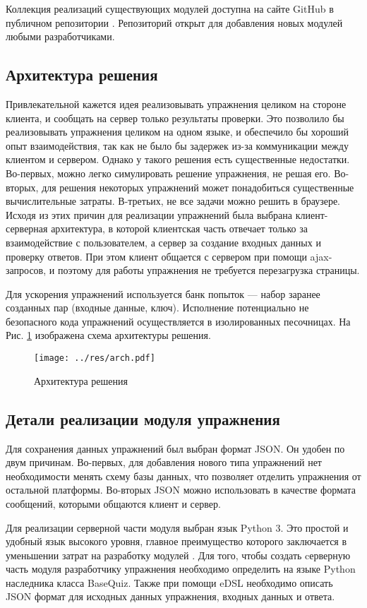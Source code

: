 \documentclass{matmex-diploma-custom}
\begin{document}
Коллекция реализаций существующих модулей доступна на сайте GitHub в
публичном репозитории \cite{plugins:repo}. Репозиторий открыт для
добавления новых модулей любыми разработчиками.

\subsection{Архитектура решения}
Привлекательной кажется идея реализовывать упражнения целиком на
стороне клиента, и сообщать на сервер только результаты проверки. Это
позволило бы реализовывать упражнения целиком на одном языке, и
обеспечило бы хороший опыт взаимодействия, так как не было бы задержек
из-за коммуникации между клиентом и сервером. Однако у такого решения
есть существенные недостатки. Во-первых, можно легко симулировать
решение упражнения, не решая его. Во-вторых, для решения некоторых
упражнений может понадобиться существенные вычислительные
затраты. В-третьих, не все задачи можно решить в браузере. Исходя из
этих причин для реализации упражнений была выбрана клиент-серверная
архитектура, в которой клиентская часть отвечает только за
взаимодействие с пользователем, а сервер за создание входных данных и
проверку ответов. При этом клиент общается с сервером при помощи
ajax-запросов, и поэтому для работы упражнения не требуется
перезагрузка страницы.

Для ускорения упражнений используется банк попыток --- набор заранее
созданных пар (входные данные, ключ).  Исполнение потенциально не
безопасного кода упражнений осуществляется в изолированных песочницах.
На Рис. \ref{fig:fig1} изображена схема архитектуры решения.
\begin{figure}[h]
  \centering
  \texttt{[image: ../res/arch.pdf]}
  \caption{Архитектура решения}
  \label{fig:fig1}
\end{figure}

\subsection{Детали реализации модуля упражнения}
Для сохранения данных упражнений был выбран формат JSON. Он удобен по
двум причинам. Во-первых, для добавления нового типа упражнений нет
необходимости менять схему базы данных, что позволяет отделить
упражнения от остальной платформы. Во-вторых JSON можно использовать в
качестве формата сообщений, которыми общаются клиент и сервер.

Для реализации серверной части модуля выбран язык Python 3. Это
простой и удобный язык высокого уровня, главное преимущество которого
заключается в уменьшении затрат на разработку модулей \cite{pyprod}.
Для того, чтобы создать cерверную часть модуля разработчику упражнения
необходимо определить на языке Python наследника класса BaseQuiz.
Также при помощи eDSL необходимо описать JSON формат для исходных
данных упражнения, входных данных и ответа.
\end{document}

